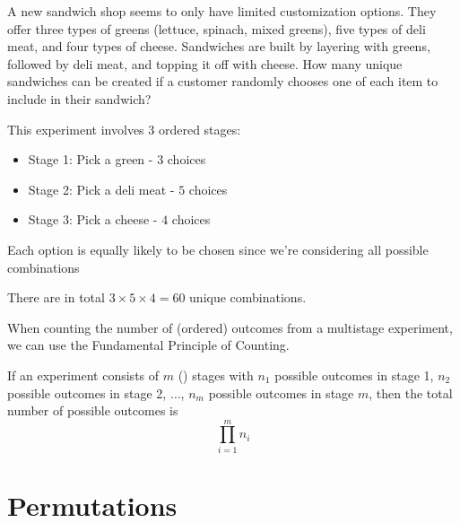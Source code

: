 \begin{example}
    A new sandwich shop seems to only have limited customization options. They offer three types of greens (lettuce, spinach, mixed greens), five types of deli meat, and four types of cheese. Sandwiches are built by layering with greens, followed by deli meat, and topping it off with cheese. How many unique sandwiches can be created if a customer randomly chooses one of each item to include in their sandwich?

    This experiment involves $3$ ordered stages:
    \begin{itemize}
        \item Stage 1: Pick a green - $3$ choices
        \item Stage 2: Pick a deli meat - $5$ choices
        \item Stage 3: Pick a cheese - $4$ choices
    \end{itemize}

    Each option is equally likely to be chosen since we're considering all possible combinations

    There are in total $3 \times 5 \times 4 = 60$ unique combinations. 
\end{example}

When counting the number of (ordered) outcomes from a multistage experiment, we can use the Fundamental Principle of Counting.

\begin{theorem}
    If an experiment consists of $m$ () stages with $n_1$ possible outcomes in stage 1, $n_2$ possible outcomes in stage 2, $\dots$, $n_m$ possible outcomes in stage $m$, then the total number of possible outcomes is $$\prod_{i=1}^m n_i$$
\end{theorem}

\section{Permutations}

